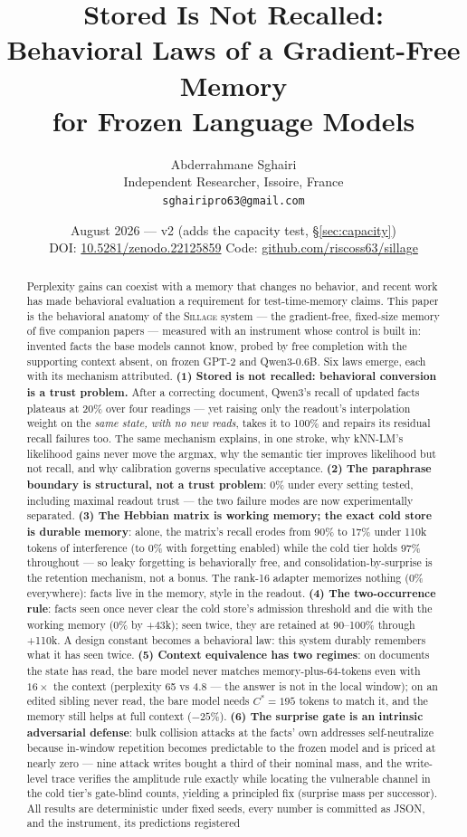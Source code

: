 \documentclass[11pt]{article}
\title{\bfseries Stored Is Not Recalled:\\
Behavioral Laws of a Gradient-Free Memory\\
for Frozen Language Models}
\author{Abderrahmane Sghairi\\
\small Independent Researcher, Issoire, France\\
\small \texttt{sghairipro63@gmail.com}}
\date{August 2026 --- v2 (adds the capacity test, \S\ref{sec:capacity})\\[2pt]
\small DOI: \href{https://doi.org/10.5281/zenodo.22125859}{10.5281/zenodo.22125859}
\qquad Code: \href{https://github.com/riscoss63/sillage}{github.com/riscoss63/sillage}}
\newcommand{\sillage}{\textsc{Sillage}}
\begin{document}
\maketitle

\begin{abstract}
Perplexity gains can coexist with a memory that changes no behavior, and recent work has made behavioral evaluation a requirement for test-time-memory claims. This paper is the behavioral anatomy of the \sillage{} system --- the gradient-free, fixed-size memory of five companion papers --- measured with an instrument whose control is built in: invented facts the base models cannot know, probed by free completion with the supporting context absent, on frozen GPT-2 and Qwen3-0.6B. Six laws emerge, each with its mechanism attributed. \textbf{(1) Stored is not recalled: behavioral conversion is a trust problem.} After a correcting document, Qwen3's recall of updated facts plateaus at 20\% over four readings --- yet raising only the readout's interpolation weight on the \emph{same state, with no new reads}, takes it to 100\% and repairs its residual recall failures too. The same mechanism explains, in one stroke, why kNN-LM's likelihood gains never move the argmax, why the semantic tier improves likelihood but not recall, and why calibration governs speculative acceptance. \textbf{(2) The paraphrase boundary is structural, not a trust problem}: 0\% under every setting tested, including maximal readout trust --- the two failure modes are now experimentally separated. \textbf{(3) The Hebbian matrix is working memory; the exact cold store is durable memory}: alone, the matrix's recall erodes from 90\% to 17\% under 110k tokens of interference (to 0\% with forgetting enabled) while the cold tier holds 97\% throughout --- so leaky forgetting is behaviorally free, and consolidation-by-surprise is the retention mechanism, not a bonus. The rank-16 adapter memorizes nothing (0\% everywhere): facts live in the memory, style in the readout. \textbf{(4) The two-occurrence rule}: facts seen once never clear the cold store's admission threshold and die with the working memory (0\% by +43k); seen twice, they are retained at 90--100\% through +110k. A design constant becomes a behavioral law: this system durably remembers what it has seen twice. \textbf{(5) Context equivalence has two regimes}: on documents the state has read, the bare model never matches memory-plus-64-tokens even with $16\times$ the context (perplexity 65 vs 4.8 --- the answer is not in the local window); on an edited sibling never read, the bare model needs $C^{*}\!=195$ tokens to match it, and the memory still helps at full context ($-25\%$). \textbf{(6) The surprise gate is an intrinsic adversarial defense}: bulk collision attacks at the facts' own addresses self-neutralize because in-window repetition becomes predictable to the frozen model and is priced at nearly zero --- nine attack writes bought a third of their nominal mass, and the write-level trace verifies the amplitude rule exactly while locating the vulnerable channel in the cold tier's gate-blind counts, yielding a principled fix (surprise mass per successor). All results are deterministic under fixed seeds, every number is committed as JSON, and the instrument, its predictions registered 
\end{abstract}
\end{document}
